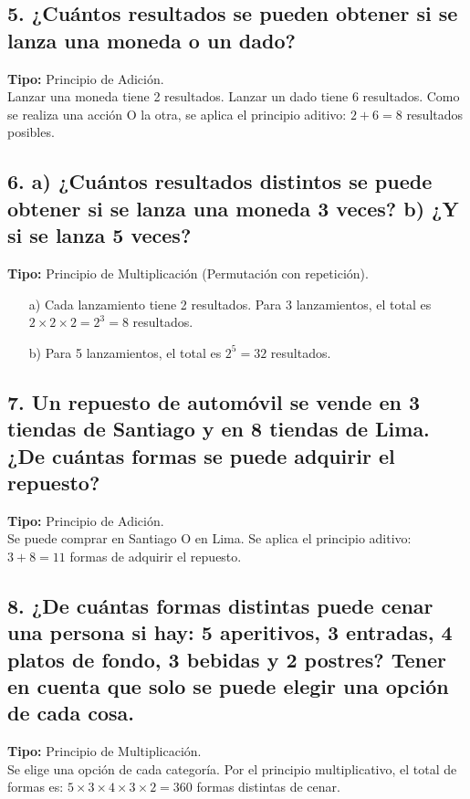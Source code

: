 \documentclass[11pt]{article}
\begin{document}
    \subsection*{5. ¿Cuántos resultados se pueden obtener si se lanza una moneda o un dado?}
    \textbf{Tipo:} Principio de Adición. \\
    Lanzar una moneda tiene 2 resultados. Lanzar un dado tiene 6 resultados. Como se realiza una acción O la otra, se aplica el principio aditivo: $2 + 6 = 8$ resultados posibles.

    \subsection*{6. a) ¿Cuántos resultados distintos se puede obtener si se lanza una moneda 3 veces? b) ¿Y si se lanza 5 veces?}
    \textbf{Tipo:} Principio de Multiplicación (Permutación con repetición).
    \begin{itemize}
        \item[a)] Cada lanzamiento tiene 2 resultados. Para 3 lanzamientos, el total es $2 \times 2 \times 2 = 2^3 = 8$ resultados.
        \item[b)] Para 5 lanzamientos, el total es $2^5 = 32$ resultados.
    \end{itemize}

    \subsection*{7. Un repuesto de automóvil se vende en 3 tiendas de Santiago y en 8 tiendas de Lima. ¿De cuántas formas se puede adquirir el repuesto?}
    \textbf{Tipo:} Principio de Adición. \\
    Se puede comprar en Santiago O en Lima. Se aplica el principio aditivo: $3 + 8 = 11$ formas de adquirir el repuesto.

    \subsection*{8. ¿De cuántas formas distintas puede cenar una persona si hay: 5 aperitivos, 3 entradas, 4 platos de fondo, 3 bebidas y 2 postres? Tener en cuenta que solo se puede elegir una opción de cada cosa.}
    \textbf{Tipo:} Principio de Multiplicación. \\
    Se elige una opción de cada categoría. Por el principio multiplicativo, el total de formas es: $5 \times 3 \times 4 \times 3 \times 2 = 360$ formas distintas de cenar.
\end{document}
